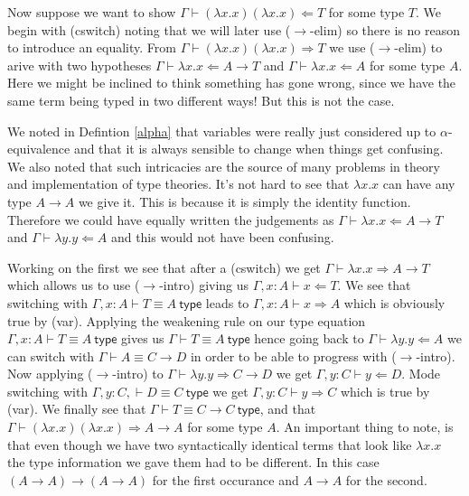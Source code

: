 \begin{example}\label{ayeaye}
    Now suppose we want to show $\Gamma \vdash (\lambda x . x)(\lambda x . x) \Leftarrow T$ for some type $T$. We begin with (cswitch) noting that we will later use ($\to$-elim) so there is no reason to introduce an equality. From $\Gamma \vdash (\lambda x . x)(\lambda x . x) \Rightarrow T$ we use ($\to$-elim) to arive with two hypotheses $\Gamma \vdash \lambda x . x \Leftarrow A \to T$ and $\Gamma \vdash \lambda x. x \Leftarrow A$ for some type $A$. Here we might be inclined to think something has gone wrong, since we have the same term being typed in two different ways! But this is not the case.
    
    We noted in Defintion \ref{alpha} that variables were really just considered up to $\alpha$-equivalence and that it is always sensible to change when things get confusing. We also noted that such intricacies are the source of many problems in theory and implementation of type theories.
    It's not hard to see that $\lambda x . x$ can have any type $A \to A$ we give it. This is because it is simply the identity function. Therefore we could have equally written the judgements as $\Gamma \vdash \lambda x . x \Leftarrow A \to T$ and $\Gamma \vdash \lambda y . y \Leftarrow A$ and this would not have been confusing.
    
    Working on the first we see that after a (cswitch) we get $\Gamma \vdash \lambda x . x \Rightarrow A \to T$ which allows us to use ($\to$-intro) giving us $\Gamma , x : A\vdash x \Leftarrow T$. We see that switching with $\Gamma , x : A \vdash T \equiv A \ \mathsf{type}$ leads to $\Gamma , x : A \vdash x \Rightarrow A$ which is obviously true by (var).
    Applying the weakening rule on our type equation $\Gamma , x : A \vdash T \equiv A \ \mathsf{type}$ gives us $\Gamma \vdash T \equiv A \ \mathsf{type}$ hence going back to $\Gamma \vdash \lambda y . y \Leftarrow A$ we can switch with $\Gamma \vdash A \equiv C \to D$ in order to be able to progress with ($\to$-intro).
    Now applying ($\to$-intro) to $\Gamma \vdash \lambda y . y \Rightarrow C \to D$ we get $\Gamma , y : C \vdash y \Leftarrow D$. Mode switching with $\Gamma , y : C, \vdash D \equiv C \ \mathsf{type}$ we get $\Gamma , y : C \vdash y \Rightarrow C$ which is true by (var).
    We finally see that $\Gamma \vdash T \equiv C \to C\ \mathsf{type}$, and that $\Gamma \vdash (\lambda x . x)(\lambda x . x) \Rightarrow A \to A$ for some type $A$. An important thing to note, is that even though we have two syntactically identical terms that look like $\lambda x . x$ the type information we gave them had to be different. In this case $(A \to A) \to (A \to A)$ for the first occurance and $A \to A$ for the second. 


\end{example}
